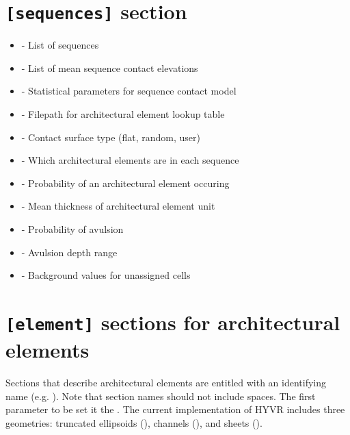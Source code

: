 \documentclass[letterpaper,10pt,english]{sphinxmanual}
\begin{document}
\section{\texttt{{[}sequences{]}} section}
\label{example:sequences-section}\begin{itemize}
\item {} 
                                     - List of sequences

\item {} 
                         - List of mean sequence contact elevations

\item {} 
      - Statistical parameters for sequence contact model

\item {} 
                          - Filepath for architectural element lookup table

\item {} 
                       - Contact surface type (flat, random, user)

\item {} 
                         - Which architectural elements are in each sequence

\item {} 
                        - Probability of an architectural element occuring

\item {} 
                      - Mean thickness of architectural element unit

\item {} 
                      - Probability of avulsion

\item {} 
                           - Avulsion depth range

\item {} 
                                      - Background values for unassigned cells

\end{itemize}


\section{\texttt{{[}element{]}} sections for architectural elements}
\label{example:element-sections-for-architectural-elements}
Sections that describe architectural elements are entitled with an identifying name (e.g. ). Note that section names should not include spaces. The first parameter to be set it the . The current implementation of HYVR includes three geometries: truncated ellipsoids (), channels (), and sheets ().
\end{document}

